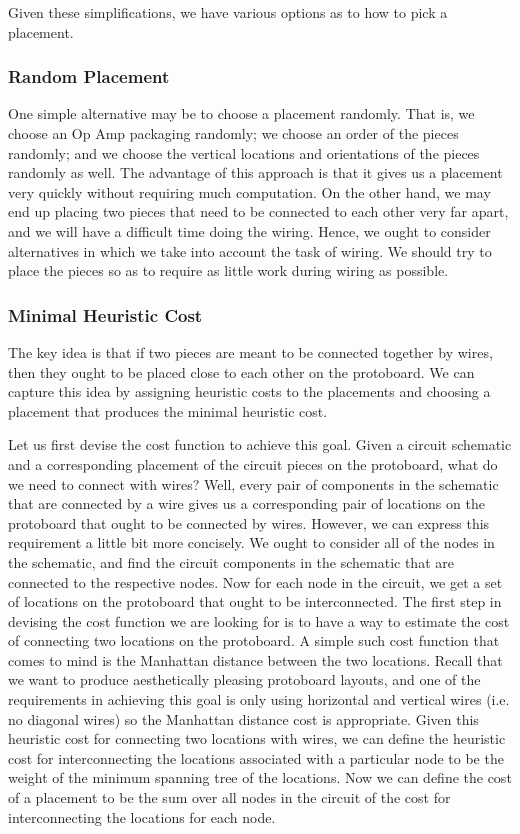 Given these simplifications, we have various options as to how to pick a
placement.

\subsubsection{Random Placement}

One simple alternative may be to choose a placement randomly. That is, we choose
an Op Amp packaging randomly; we choose an order of the pieces randomly; and we
choose the vertical locations and orientations of the pieces randomly as well.
The advantage of this
approach is that it gives us a placement very quickly without requiring much
computation. On the other hand, we may end up placing two pieces that need to be
connected to each other very far apart, and we will have a difficult time doing
the wiring. Hence, we ought to consider alternatives in which we take into
account the task of wiring. We should try to place the pieces so as to require
as little work during wiring as possible.

\subsubsection{Minimal Heuristic Cost}

The key idea is that if two pieces are meant to be connected together by wires,
then they ought to be placed close to each other on the protoboard. We can
capture this idea by assigning heuristic costs to the placements and choosing
a placement that produces the minimal heuristic cost.

Let us first devise the cost function to achieve this goal. Given a circuit
schematic and a corresponding placement of the circuit pieces on the protoboard,
what do we need to connect with wires? Well, every pair of components in the
schematic that are connected by a wire gives us a corresponding pair of
locations on the protoboard that ought to be connected by wires. However, we can
express this requirement a little bit more concisely. We ought to consider all
of the nodes in the schematic, and find the circuit components in the schematic
that are connected to the respective nodes. Now for each node in the circuit, we
get a set of locations on the protoboard that ought to be interconnected. The
first step in devising the cost function we are looking for is to have a way to
estimate the cost of connecting two locations on the protoboard. A simple such
cost function that comes to mind is the Manhattan distance between the two
locations. Recall that we want to produce aesthetically pleasing protoboard
layouts, and one of the requirements in achieving this goal is only using
horizontal and vertical wires (i.e. no diagonal wires) so the Manhattan distance
cost is appropriate. Given this heuristic cost for connecting two locations with
wires, we can define the heuristic cost for interconnecting the locations
associated with a particular node to be the weight of the minimum spanning tree
of the locations. Now we can define the cost of a placement to be the sum over
all nodes in the circuit of the cost for interconnecting the locations for each
node.

